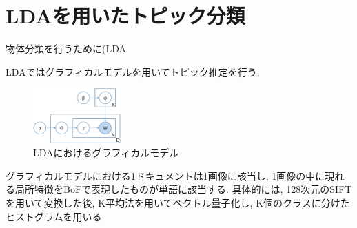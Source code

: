 \section{LDAを用いたトピック分類}
物体分類を行うために(LDA

LDAではグラフィカルモデルを用いてトピック推定を行う.
\begin{figure}[h!]
	\begin{center}
		\includegraphics[width=0.30\textwidth,clip]{img/graphicalmodel.eps}
	\end{center}
	\caption{LDAにおけるグラフィカルモデル}
	\label{fig:graphical_model}
\end{figure} 
\par
グラフィカルモデルにおける1ドキュメントは1画像に該当し, 
1画像の中に現れる局所特徴をBoFで表現したものが単語に該当する.
具体的には, 128次元のSIFT\cite{}を用いて変換した後, 
K平均法\cite{kmeans}を用いてベクトル量子化し, K個のクラスに分けたヒストグラムを用いる.
\par


